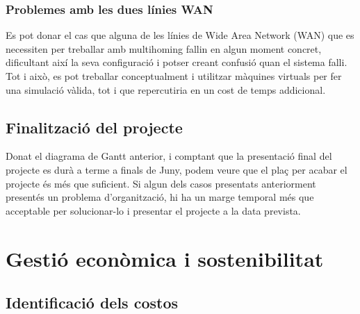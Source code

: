\documentclass[11pt]{article}
\begin{document}
\subsubsection{Problemes amb les dues línies WAN}
Es pot donar el cas que alguna de les línies de Wide Area Network (WAN) que es necessiten per treballar amb multihoming fallin en algun moment concret, dificultant així la seva configuració i potser creant confusió quan el sistema falli. Tot i això, es pot treballar conceptualment i utilitzar màquines virtuals per fer una simulació vàlida, tot i que repercutiria en un cost de temps addicional.

\subsection{Finalització del projecte}
Donat el diagrama de Gantt anterior, i comptant que la presentació final del projecte es durà a terme a finals de Juny, podem veure que el plaç per acabar el projecte és més que suficient. Si algun dels casos presentats anteriorment presentés un problema d’organització, hi ha un marge temporal més que acceptable per solucionar-lo i presentar el projecte a la data prevista.

\section{Gestió econòmica i sostenibilitat}
\subsection{Identificació dels costos}
\end{document}
